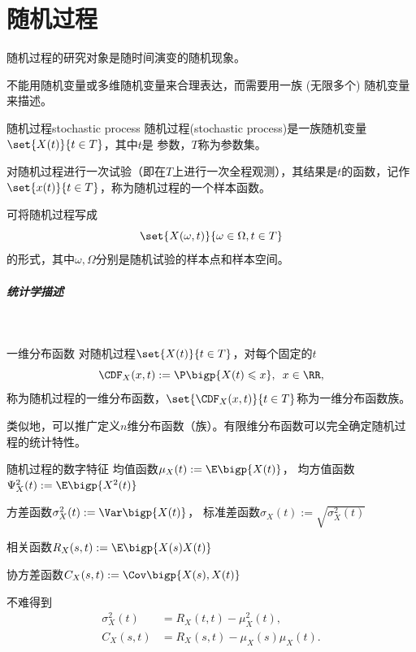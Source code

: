 \chapter{随机过程}
随机过程的研究对象是随时间演变的随机现象。

不能用随机变量或多维随机变量来合理表达，而需要用一族 (无限多个) 随机变量来描述。
\begin{definition}{随机过程}{stochastic process}
	随机过程(stochastic process)是一族随机变量$\set{X(t)}{t\in T}$，其中$ t $是 参数，$T$称为参数集。
\end{definition}
对随机过程进行一次试验（即在$ T $上进行一次全程观测），其结果是$t$的函数，记作$\set{x(t)}{t\in T}$，称为随机过程的一个样本函数。

可将随机过程写成
\[
	\set{X(\omega,t)}{\omega\in\Omega,t\in T}
\]
的形式，其中$\omega,\Omega$分别是随机试验的样本点和样本空间。
\paragraph{统计学描述}~
\begin{definition}{一维分布函数}{}
	对随机过程$\set{X(t)}{t\in T}$，对每个固定的$t$
	\begin{equation}
		\CDF_X(x,t):=\P\bigp{X(t)\leqslant x},\enspace x\in\RR,
	\end{equation}
	称为随机过程的一维分布函数，$\set{\CDF_X(x,t)}{t\in T}$称为一维分布函数族。
\end{definition}
类似地，可以推广定义$n$维分布函数（族）。有限维分布函数可以完全确定随机过程的统计特性。
\begin{definition}{随机过程的数字特征}{}
	均值函数$\mu_X(t):=\E\bigp{X(t)}$，
	均方值函数$\Psi^2_X(t):=\E\bigp{X^2(t)}$

	方差函数$\sigma_X^2(t):=\Var\bigp{X(t)}$，
	标准差函数$\sigma_X(t):=\sqrt{\sigma^2_X(t)}$

	相关函数$R_X(s,t):=\E\bigp{X(s)X(t)}$

	协方差函数$C_X(s,t):=\Cov\bigp{X(s),X(t)}$
\end{definition}
不难得到
\begin{align*}
	\sigma_X^2(t)&=R_X(t,t)-\mu_X^2(t),\\
	C_X(s,t)&=R_X(s,t)-\mu_X(s)\mu_X(t).
\end{align*}
